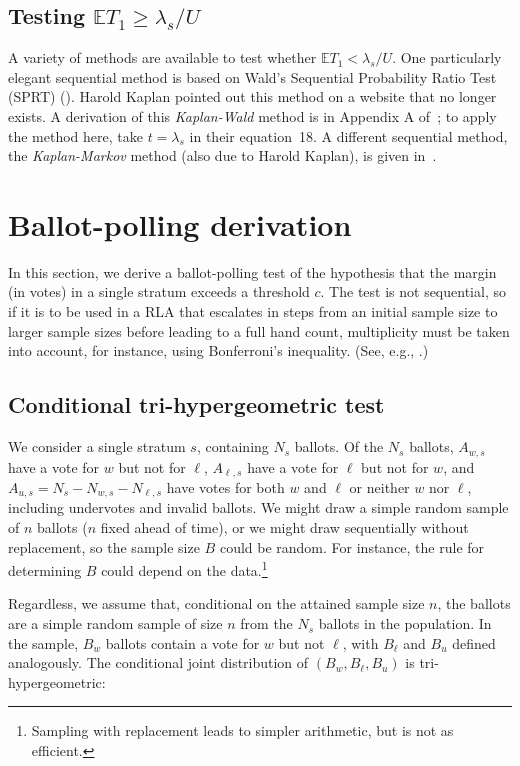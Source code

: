 \documentclass[runningheads]{llncs}
\begin{document}
\subsection{Testing $\mathbb{E} T_1 \ge \lambda_s/U$}

A variety of methods are available to test whether $\mathbb{E} T_1 < \lambda_s/U$.
One particularly elegant sequential method is based on Wald's Sequential Probability
Ratio Test (SPRT) (\cite{wald45}).
Harold Kaplan pointed out this method on a website that no longer exists.
A derivation of this \emph{Kaplan-Wald} method is in Appendix A of~\cite{starkTeague14};
to apply the method here, take $t = \lambda_s$ in their equation~18.
A different sequential method, the \emph{Kaplan-Markov} method (also due to Harold Kaplan), 
is given in~\cite{stark09b}.


\section{Ballot-polling derivation}\label{sec:appendix-polling}
In this section, we derive a ballot-polling test of the hypothesis that the margin (in votes) in a single stratum exceeds a threshold $c$. 
The test is not sequential, so if it is to be used in a RLA that escalates in steps from an initial sample size to larger sample sizes before leading to a full hand count, multiplicity must be taken into account, for instance, using Bonferroni's inequality.
(See, e.g., \cite{stark08a,stark09a}.)

\subsection{Conditional tri-hypergeometric test}

We consider a single stratum $s$, containing $N_s$ ballots.
Of the $N_s$ ballots,
$A_{w,s}$ have a vote for $w$ but not for $\ell$, $A_{\ell,s}$ have a vote for $\ell$ but not for $w$, and $A_{u,s} = N_s - N_{w,s} - N_{\ell,s}$ have votes for both $w$ and $\ell$ or neither $w$ nor $\ell$, including undervotes and invalid ballots.
We might draw a simple random sample of $n$ ballots ($n$ fixed ahead of time), or we might draw 
sequentially without replacement, so the sample size $B$ could be random.
For instance, the rule for determining $B$ could depend on the data.\footnote{%
   Sampling with replacement leads to simpler arithmetic, but is not as efficient.
}

Regardless, we assume that, conditional on the attained sample size $n$, the ballots are a simple random sample of size $n$ from the $N_s$ ballots in the population.
In the sample, $B_w$ ballots contain a vote for $w$ but not $\ell$, with $B_\ell$ and $B_u$ defined analogously.
The conditional joint distribution of
$(B_w, B_\ell, B_u)$ is tri-hypergeometric: 
\end{document}
